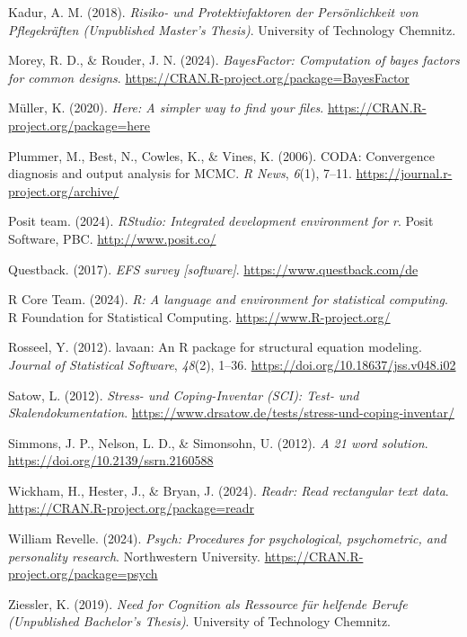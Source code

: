 \documentclass[
  man]{apa6}
\newlength{\cslhangindent}
\newenvironment{CSLReferences}[2] %
 {\begin{list}{}{%
  \setlength{\itemindent}{0pt}
  \setlength{\leftmargin}{0pt}
  \setlength{\parsep}{0pt}
  \ifodd #1
   \setlength{\leftmargin}{\cslhangindent}
   \setlength{\itemindent}{-1\cslhangindent}
  \fi
  \setlength{\itemsep}{#2\baselineskip}}}
 {\end{list}}
\begin{document}
\begin{CSLReferences}{1}{0}
Kadur, A. M. (2018). \emph{{Risiko}- und {Protektivfaktoren} der {Persönlichkeit} von {Pflegekräften} ({Unpublished Master's Thesis})}. University of Technology Chemnitz.

Morey, R. D., \& Rouder, J. N. (2024). \emph{BayesFactor: Computation of bayes factors for common designs}. \url{https://CRAN.R-project.org/package=BayesFactor}

Müller, K. (2020). \emph{Here: A simpler way to find your files}. \url{https://CRAN.R-project.org/package=here}

Plummer, M., Best, N., Cowles, K., \& Vines, K. (2006). CODA: Convergence diagnosis and output analysis for MCMC. \emph{R News}, \emph{6}(1), 7--11. \url{https://journal.r-project.org/archive/}

Posit team. (2024). \emph{RStudio: Integrated development environment for r}. Posit Software, PBC. \url{http://www.posit.co/}

Questback. (2017). \emph{EFS survey {[}software{]}}. \url{https://www.questback.com/de}

R Core Team. (2024). \emph{R: A language and environment for statistical computing}. R Foundation for Statistical Computing. \url{https://www.R-project.org/}

Rosseel, Y. (2012). {lavaan}: An {R} package for structural equation modeling. \emph{Journal of Statistical Software}, \emph{48}(2), 1--36. \url{https://doi.org/10.18637/jss.v048.i02}

Satow, L. (2012). \emph{{Stress- und Coping-Inventar (SCI): Test- und Skalendokumentation}}. \url{https://www.drsatow.de/tests/stress-und-coping-inventar/}

Simmons, J. P., Nelson, L. D., \& Simonsohn, U. (2012). \emph{A 21 word solution}. \url{https://doi.org/10.2139/ssrn.2160588}

Wickham, H., Hester, J., \& Bryan, J. (2024). \emph{Readr: Read rectangular text data}. \url{https://CRAN.R-project.org/package=readr}

William Revelle. (2024). \emph{Psych: Procedures for psychological, psychometric, and personality research}. Northwestern University. \url{https://CRAN.R-project.org/package=psych}

Ziessler, K. (2019). \emph{{Need for Cognition als Ressource für helfende Berufe} ({Unpublished Bachelor's Thesis})}. University of Technology Chemnitz.

\end{CSLReferences}
\end{document}
